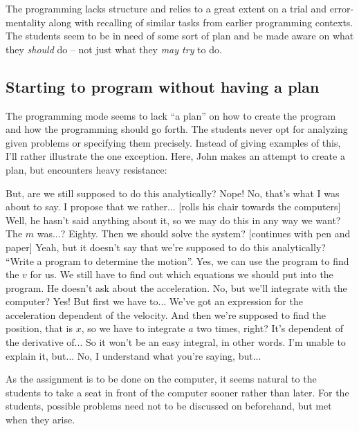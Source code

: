 \documentclass[aps,prb,floatfix,twocolumn,twoside,english]{revtex4-1}
\begin{document}
The programming lacks structure and relies to a great extent on a trial and error-mentality along with recalling of similar tasks from earlier programming contexts. The students seem to be in need of some sort of plan and be made aware on what they \textit{should} do -- not just what they \textit{may try} to do.


\subsection{Starting to program without having a plan}

The programming mode seems to lack ``a plan'' on how to create the program and how the programming should go forth. The students never opt for analyzing given problems or specifying them precisely. Instead of giving examples of this, I'll rather illustrate the one exception. Here, John makes an attempt to create a plan, but encounters heavy resistance: 

\begin{dialogue}
\small
{} But, are we still supposed to do this analytically?
 Nope! 
 No, that's what I was about to say. I propose that we rather... [rolls his chair towards the computers] Well, he hasn't said anything about it, so we may do this in any way we want?
 The $m$ was...? Eighty. Then we should solve the system? [continues with pen and paper]
 Yeah, but it doesn't say that we're supposed to do this analytically?
 ``Write a program to determine the motion''. 
 Yes, we can use the program to find the $v$ for us.
 We still have to find out which equations we should put into the program. He doesn't ask about the acceleration.
 No, but we'll integrate with the computer?
 Yes! But first we have to... We've got an expression for the acceleration dependent of the velocity. And then we're supposed to find the position, that is $x$, so we have to integrate $a$ two times, right? It's dependent of the derivative of... So it won't be an easy integral, in other words. I'm unable to explain it, but...
 No, I understand what you're saying, but...
\end{dialogue}

As the assignment is to be done on the computer, it seems natural to the students to take a seat in front of the computer sooner rather than later. For the students, possible problems need not to be discussed on beforehand, but met when they arise.
\end{document}
